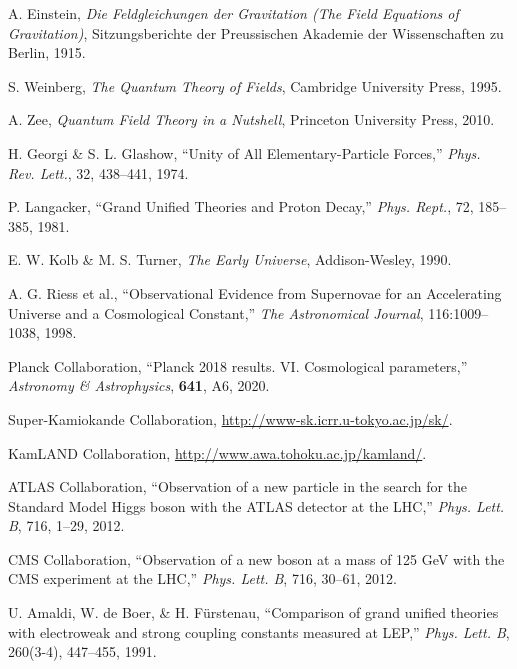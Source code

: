 \documentclass[12pt]{article}
\begin{document}
\begin{thebibliography}{99}

A. Einstein,
\textit{Die Feldgleichungen der Gravitation (The Field Equations of Gravitation)},
Sitzungsberichte der Preussischen Akademie der Wissenschaften zu Berlin, 1915.

S. Weinberg, 
\textit{The Quantum Theory of Fields}, 
Cambridge University Press, 1995.

A. Zee,
\textit{Quantum Field Theory in a Nutshell},
Princeton University Press, 2010.

H. Georgi \& S. L. Glashow,
``Unity of All Elementary-Particle Forces,''
\emph{Phys. Rev. Lett.}, 32, 438--441, 1974.

P. Langacker,
``Grand Unified Theories and Proton Decay,''
\emph{Phys. Rept.}, 72, 185--385, 1981.

E. W. Kolb \& M. S. Turner,
\textit{The Early Universe},
Addison-Wesley, 1990.

A. G. Riess et al.,
``Observational Evidence from Supernovae for an Accelerating Universe and a Cosmological Constant,''
\emph{The Astronomical Journal}, 116:1009--1038, 1998.

Planck Collaboration,
``Planck 2018 results. VI. Cosmological parameters,''
\emph{Astronomy \& Astrophysics}, \textbf{641}, A6, 2020.

Super-Kamiokande Collaboration,
\url{http://www-sk.icrr.u-tokyo.ac.jp/sk/}.

KamLAND Collaboration,
\url{http://www.awa.tohoku.ac.jp/kamland/}.

ATLAS Collaboration,
``Observation of a new particle in the search for the Standard Model Higgs boson with the ATLAS detector at the LHC,''
\emph{Phys. Lett. B}, 716, 1--29, 2012.

CMS Collaboration,
``Observation of a new boson at a mass of 125 GeV with the CMS experiment at the LHC,''
\emph{Phys. Lett. B}, 716, 30--61, 2012.

U. Amaldi, W. de Boer, \& H. F\"urstenau,
``Comparison of grand unified theories with electroweak and strong coupling constants measured at LEP,''
\emph{Phys. Lett. B}, 260(3-4), 447--455, 1991.

\end{thebibliography}
\end{document}
